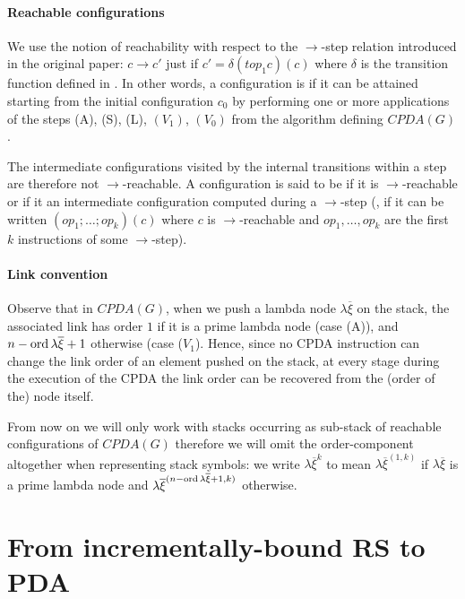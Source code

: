 \documentclass[a4paper,draft]{article}[12pt]
\theoremstyle{remark}
\theoremstyle{definition}
\begin{document}
\paragraph{Reachable configurations}
We use the notion of reachability with respect to the $\rightarrow$-step relation introduced in the original paper:
$c\rightarrow c'$ just if $c' = \delta(top_1 c)(c)$ where $\delta$ is the transition
function defined in \cite[Figure 2]{hague-collaps-full}.
In other words, a configuration is  if it can be attained starting from the initial configuration $c_0$ by performing
one or more applications of the steps (A), (S), (L), $(V_1)$, $(V_0)$ from the algorithm defining $CPDA(G)$.

The intermediate configurations visited by the internal transitions within a step are therefore not $\rightarrow$-reachable.
A configuration is said to be  if it is $\rightarrow$-reachable or if it
an intermediate configuration computed during a $\rightarrow$-step
(\ie, if it can be written $(op_1;\ldots;op_k)(c)$ where $c$ is $\rightarrow$-reachable and
$op_1, \ldots, op_k$ are the first $k$ instructions of some $\rightarrow$-step).

\paragraph{Link convention}
Observe that in $CPDA(G)$, when we push a lambda node $\lambda \overline{\xi}$ on the stack, the associated link has order $1$ if it is a prime lambda node (case (A)), and $n-\mathop{\mathrm{ord}}{\lambda \overline{\xi}}+1$ otherwise (case ($V_1$). Hence, since no CPDA instruction can change the link order of an element pushed on the stack, at every stage during the execution of the CPDA the link order can be recovered from the (order of the) node itself.

From now on we will only work with stacks occurring as sub-stack of reachable configurations of $CPDA(G)$
therefore we will omit the order-component altogether when representing stack symbols: we write $\lambda\overline\xi^{k}$ to mean  $\lambda\overline\xi^{(1,k)}$ if $\lambda\overline\xi$ is a prime lambda node
and $\lambda\overline\xi^{(n-\mathop{\mathrm{ord}}{\lambda \overline{\xi}}+1,k)}$ otherwise.

\section{From incrementally-bound RS to PDA}
\end{document}
